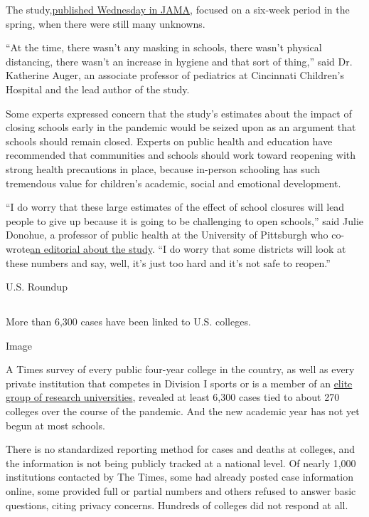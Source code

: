 The
study,\href{https://jamanetwork.com/journals/jama/fullarticle/10.1001/jama.2020.14348}{published
Wednesday in JAMA}, focused on a six-week period in the spring, when
there were still many unknowns.

``At the time, there wasn't any masking in schools, there wasn't
physical distancing, there wasn't an increase in hygiene and that sort
of thing,'' said Dr. Katherine Auger, an associate professor of
pediatrics at Cincinnati Children's Hospital and the lead author of the
study.

Some experts expressed concern that the study's estimates about the
impact of closing schools early in the pandemic would be seized upon as
an argument that schools should remain closed. Experts on public health
and education have recommended that communities and schools should work
toward reopening with strong health precautions in place, because
in-person schooling has such tremendous value for children's academic,
social and emotional development.

``I do worry that these large estimates of the effect of school closures
will lead people to give up because it is going to be challenging to
open schools,'' said Julie Donohue, a professor of public health at the
University of Pittsburgh who
co-wrote\href{https://jamanetwork.com/journals/jama/fullarticle/10.1001/jama.2020.13092}{an
editorial about the study}. ``I do worry that some districts will look
at these numbers and say, well, it's just too hard and it's not safe to
reopen.''

U.S. Roundup

\hypertarget{-6}{%
\subsection{}\label{-6}}

More than 6,300 cases have been linked to U.S. colleges.

Image

A Times survey of every public four-year college in the country, as well
as every private institution that competes in Division I sports or is a
member of an
\href{https://www.aau.edu/sites/default/files/AAU-Files/Who-We-Are/AAU-Member-List.pdf}{elite
group of research universities}, revealed at least 6,300 cases tied to
about 270 colleges over the course of the pandemic. And the new academic
year has not yet begun at most schools.

There is no standardized reporting method for cases and deaths at
colleges, and the information is not being publicly tracked at a
national level. Of nearly 1,000 institutions contacted by The Times,
some had already posted case information online, some provided full or
partial numbers and others refused to answer basic questions, citing
privacy concerns. Hundreds of colleges did not respond at all.

